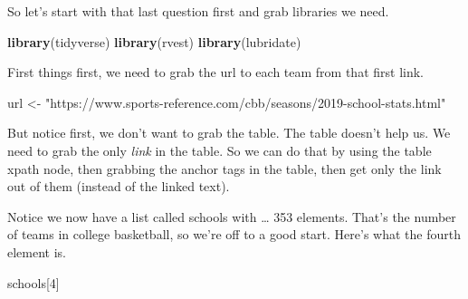 \documentclass[
]{book}
\newenvironment{Shaded}{\begin{snugshade}}{\end{snugshade}}
\newcommand{\DataTypeTok}[1]{\textcolor[rgb]{0.13,0.29,0.53}{#1}}
\newcommand{\DecValTok}[1]{\textcolor[rgb]{0.00,0.00,0.81}{#1}}
\newcommand{\KeywordTok}[1]{\textcolor[rgb]{0.13,0.29,0.53}{\textbf{#1}}}
\newcommand{\NormalTok}[1]{#1}
\newcommand{\OperatorTok}[1]{\textcolor[rgb]{0.81,0.36,0.00}{\textbf{#1}}}
\newcommand{\StringTok}[1]{\textcolor[rgb]{0.31,0.60,0.02}{#1}}
\begin{document}
So let's start with that last question first and grab libraries we need.

\begin{Shaded}
\begin{Highlighting}[]
\KeywordTok{library}\NormalTok{(tidyverse)}
\KeywordTok{library}\NormalTok{(rvest)}
\KeywordTok{library}\NormalTok{(lubridate)}
\end{Highlighting}
\end{Shaded}

First things first, we need to grab the url to each team from that first link.

\begin{Shaded}
\begin{Highlighting}[]
\NormalTok{url <-}\StringTok{ "https://www.sports-reference.com/cbb/seasons/2019-school-stats.html"}
\end{Highlighting}
\end{Shaded}

But notice first, we don't want to grab the table. The table doesn't help us. We need to grab the only \emph{link} in the table. So we can do that by using the table xpath node, then grabbing the anchor tags in the table, then get only the link out of them (instead of the linked text).

\begin{Shaded}
\end{Shaded}

Notice we now have a list called schools with \ldots{} 353 elements. That's the number of teams in college basketball, so we're off to a good start. Here's what the fourth element is.

\begin{Shaded}
\begin{Highlighting}[]
\NormalTok{schools[}\DecValTok{4}\NormalTok{]}
\end{Highlighting}
\end{Shaded}
\end{document}
